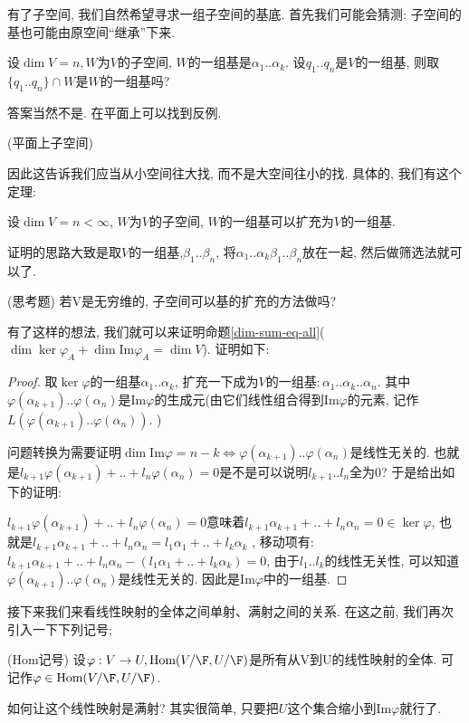 有了子空间, 我们自然希望寻求一组子空间的基底. 首先我们可能会猜测: 子空间的基也可能由原空间``继承''下来. 
\begin{problem}
设$\dim V=n,$$W$为$V$的子空间, \textbf{$W$}的一组基是$\alpha_{1}..\alpha_{k}$.
设$q_{1}..q_{n}$是$V$的一组基, 则取$\{q_{1}..q_{n}\}\cap W$是$W$的一组基吗?
\end{problem}
答案当然不是. 在平面上可以找到反例. 
\begin{example}
(平面上子空间)
\end{example}
因此这告诉我们应当从小空间往大找, 而不是大空间往小的找. 具体的, 我们有这个定理:
\begin{thm}
设$\dim V=n<\infty$, $W$为$V$的子空间, $W$的一组基可以扩充为$V$的一组基. 
\end{thm}
证明的思路大致是取$V$的一组基,$\beta_{1}..\beta_{n}$, 将$\alpha_{1}..\alpha_{k}\beta_{1}..\beta_{n}$放在一起,
然后做筛选法就可以了. 
\begin{problem}
(思考题) 若V是无穷维的, 子空间可以基的扩充的方法做吗?
\end{problem}
有了这样的想法, 我们就可以来证明命题\ref{dim-sum-eq-all}($\dim\ker\varphi_{A}+\dim\text{Im}\varphi_{A}=\dim V$).
证明如下:
\begin{proof}
取$\ker\varphi$的一组基$\alpha_{1}..\alpha_{k}$, 扩充一下成为$V$的一组基$:\alpha_{1}..\alpha_{k}..\alpha_{n}$.
其中$\varphi(\alpha_{k+1})..\varphi(\alpha_{n})$是$\text{Im}\varphi$的生成元(由它们线性组合得到$\text{Im}\varphi$的元素,
记作$L(\varphi(\alpha_{k+1})..\varphi(\alpha_{n}))$. )

问题转换为需要证明$\dim\text{Im}\varphi=n-k\Leftrightarrow\varphi(\alpha_{k+1})..\varphi(\alpha_{n})$是线性无关的.
也就是$l_{k+1}\varphi(\alpha_{k+1})+..+l_{n}\varphi(\alpha_{n})=0$是不是可以说明$l_{k+1}..l_{n}$全为0?
于是给出如下的证明:

$l_{k+1}\varphi(\alpha_{k+1})+..+l_{n}\varphi(\alpha_{n})=0$意味着$l_{k+1}\alpha_{k+1}+..+l_{n}\alpha_{n}=0\in\ker\varphi$,
也就是$l_{k+1}\alpha_{k+1}+..+l_{n}\alpha_{n}=l_{1}\alpha_{1}+..+l_{k}\alpha_{k}$
, 移动项有: $l_{k+1}\alpha_{k+1}+..+l_{n}\alpha_{n}-\left(l_{1}\alpha_{1}+..+l_{k}\alpha_{k}\right)=0$,
由于$l_{1}..l_{k}$的线性无关性, 可以知道$\varphi(\alpha_{k+1})..\varphi(\alpha_{n})$是线性无关的.
因此是$\text{Im}\varphi$中的一组基. 
\end{proof}
接下来我们来看线性映射的全体之间单射、满射之间的关系. 在这之前, 我们再次引入一下下列记号; 
\begin{defn}
(Hom记号) 设$\varphi:V\to U,\text{Hom}(V/\F,U/\F)$是所有从V到U的线性映射的全体. 可记作$\varphi\in\text{Hom}(V/\F,U/\F)$. 
\end{defn}
如何让这个线性映射是满射? 其实很简单, 只要把$U$这个集合缩小到$\text{Im}\varphi$就行了. 

